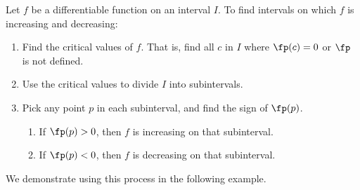 {Let $f$ be a differentiable function on an interval $I$. To find intervals on which $f$ is increasing and decreasing:
\begin{enumerate}
\item	Find the critical values of $f$. That is, find all $c$ in $I$ where $\fp(c) = 0$ or $\fp$ is not defined.
\item		Use the critical values to divide $I$ into subintervals.
\item		Pick any point $p$ in each subinterval, and find the sign of $\fp(p)$. 
		\begin{enumerate}
		\item		If $\fp(p)>0$, then $f$ is increasing on that subinterval.
		\item		If $\fp(p)<0$, then $f$ is decreasing on that subinterval.
		\end{enumerate}
\end{enumerate}
}

We demonstrate using this process in the following example.\\

